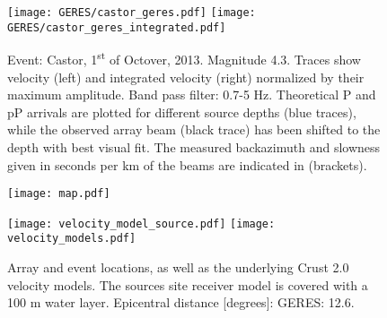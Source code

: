 \documentclass{article}
\begin{document}
\begin{figure}
    \begin{minipage}{0.91\textwidth}
    \texttt{[image: GERES/castor\_geres.pdf]}
    \texttt{[image: GERES/castor\_geres\_integrated.pdf]}
    \end{minipage}
    \begin{minipage}{0.91\textwidth}
    \centering
    \caption{Event: Castor, 1\textsuperscript{st} of Octover, 2013. Magnitude 4.3. Traces show velocity (left) and integrated velocity (right) normalized by their maximum amplitude. Band pass filter: 0.7-5 Hz. Theoretical P and pP arrivals are plotted for different source depths (blue traces), while the observed array beam (black trace)
    has been shifted to the depth with best visual fit. The measured backazimuth and slowness given in seconds per km of the beams are indicated in (brackets).}
    \end{minipage}
\end{figure}
\begin{figure}
    \begin{minipage}{0.61\textwidth}
    \texttt{[image: map.pdf]}
    \end{minipage}
    \begin{minipage}{0.30\textwidth}
    \texttt{[image: velocity\_model\_source.pdf]}
    \texttt{[image: velocity\_models.pdf]}
    \end{minipage}
    \caption{Array and event locations, as well as the underlying Crust 2.0 velocity models. The sources site receiver model is covered with a 100 m water layer. Epicentral distance [degrees]: GERES: 12.6. }
\end{figure}
\end{document}
